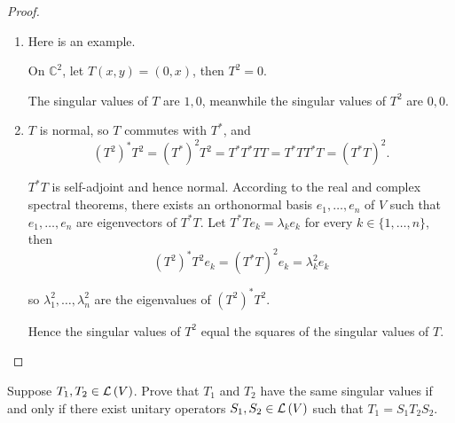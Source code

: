 \begin{proof}
    \begin{enumerate}[label={(\alph*)}]
        \item Here is an example.

              On $\mathbb{C}^{2}$, let $T(x, y) = (0, x)$, then $T^{2} = 0$.

              The singular values of $T$ are $1, 0$, meanwhile the singular values of $T^{2}$ are $0, 0$.
        \item $T$ is normal, so $T$ commutes with $T^{*}$, and
              \[
                  {(T^{2})}^{*}T^{2} = {(T^{*})}^{2}T^{2} = T^{*}T^{*}TT = T^{*}TT^{*}T = {(T^{*}T)}^{2}.
              \]

              $T^{*}T$ is self-adjoint and hence normal. According to the real and complex spectral theorems, there exists an orthonormal basis $e_{1}, \ldots, e_{n}$ of $V$ such that $e_{1}, \ldots, e_{n}$ are eigenvectors of $T^{*}T$. Let $T^{*}Te_{k} = \lambda_{k}e_{k}$ for every $k\in\{1,\ldots,n\}$, then
              \[
                  {(T^{2})}^{*}T^{2}e_{k} = {(T^{*}T)}^{2}e_{k} = \lambda_{k}^{2}e_{k}
              \]

              so $\lambda_{1}^{2}, \ldots, \lambda_{n}^{2}$ are the eigenvalues of ${(T^{2})}^{*}T^{2}$.

              Hence the singular values of $T^{2}$ equal the squares of the singular values of $T$.
    \end{enumerate}
\end{proof}
\newpage

\begin{exercise}
    Suppose $T_{1}, T_{2} \in \mathcal{L}\left({V}\right)$. Prove that $T_{1}$ and $T_{2}$ have the same singular values if and only if there exist unitary operators $S_{1}, S_{2} \in \mathcal{L}\left({V}\right)$ such that $T_{1} = S_{1}T_{2}S_{2}$.
\end{exercise}

